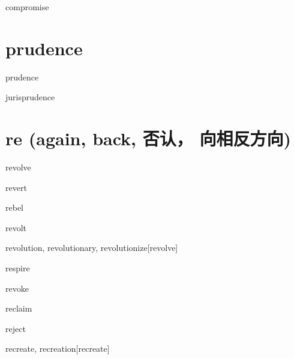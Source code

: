 \begin{RefWord}{compromise}
\end{RefWord}

\section{prudence}

\begin{RefWord}{prudence}
\end{RefWord}

\begin{RefWord}{jurisprudence}
\end{RefWord}

\section{re (again, back, 否认， 向相反方向)}

\begin{RefWord}{revolve}
\end{RefWord}

\begin{RefWord}{revert}
\end{RefWord}

\begin{RefWord}{rebel}
\end{RefWord}

\begin{RefWord}{revolt}
\end{RefWord}

\begin{RefWord}{revolution, revolutionary, revolutionize}[revolve]
\end{RefWord}

\begin{RefWord}{respire}
\end{RefWord}

\begin{RefWord}{revoke}
\end{RefWord}

\begin{RefWord}{reclaim}
\end{RefWord}

\begin{RefWord}{reject}
\end{RefWord}

\begin{RefWord}{recreate, recreation}[recreate]
\end{RefWord}

